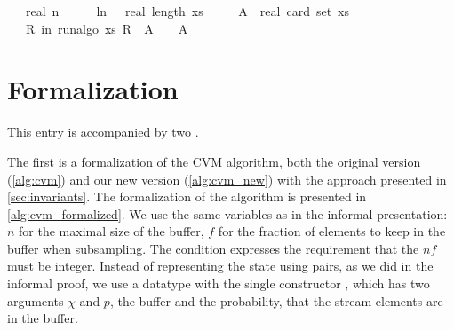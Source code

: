 \begin{algorithm}[h]
\begin{isabelle_cm}
\ \ \ {\isacartoucheopen}real\ n\ {\isasymge}\ {}{}\ {\isacharslash}{\kern0pt}\ {\isasymepsilon}\ {\isacharasterisk}{\kern0pt}\ ln\ {\isacharparenleft}{\kern0pt}{}\ {\isacharasterisk}{\kern0pt}\ real\ {\isacharparenleft}{\kern0pt}length\ xs{\isacharparenright}{\kern0pt}\ {\isacharslash}{\kern0pt}\ {\isasymdelta}{\isacharparenright}{\kern0pt}{\isacartoucheclose}\isanewline
\ \ \ {\isacartoucheopen}A\ {\isasymequiv}\ real\ {\isacharparenleft}{\kern0pt}card\ {\isacharparenleft}{\kern0pt}set\ xs{\isacharparenright}{\kern0pt}{\isacharparenright}{\kern0pt}{\isacartoucheclose}\isanewline
\ \ \ {\isacartoucheopen}{\isasymP}{\isacharparenleft}{\kern0pt}R\ in\ run{\isacharunderscore}{\kern0pt}algo\ xs{\isachardot}{\kern0pt}\ {\isasymbar}R\ {\isacharminus}{\kern0pt}\ A{\isasymbar}\ {\isachargreater}{\kern0pt}\ {\isasymepsilon}\ {\isacharasterisk}{\kern0pt}\ A{\isacharparenright}{\kern0pt}\ {\isasymle}\ {\isasymdelta}{\isacartoucheclose}\isanewline
{}
\end{isabelle_cm}
\end{algorithm}
\section{Formalization}
This entry is accompanied by two .

The first is a formalization of the CVM algorithm, both the original version (\cref{alg:cvm}) and our new version (\cref{alg:cvm_new}) with the approach presented in \cref{sec:invariants}.
The formalization of the algorithm is presented in \cref{alg:cvm_formalized}.
We use the same variables as in the informal presentation: $n$ for the maximal size of the buffer, $f$ for the fraction of elements to keep in the buffer when subsampling.
The condition  expresses the requirement that the $nf$ must be integer.
Instead of representing the state using pairs, as we did in the informal proof, we use a datatype with the single constructor , which has two arguments $\chi$ and $p$, the buffer and the probability, that the stream elements are in the buffer.

